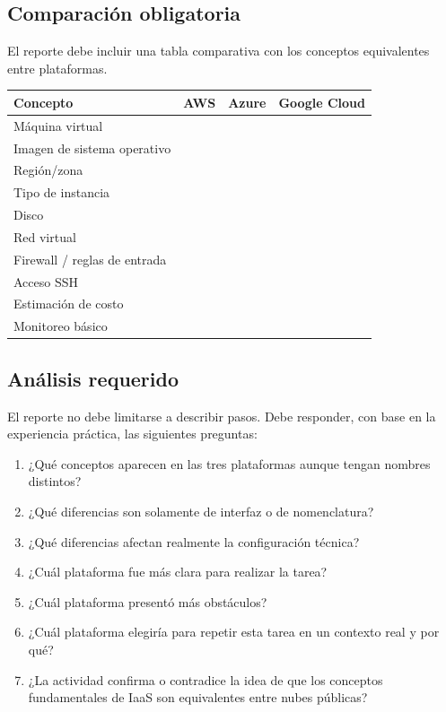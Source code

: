 \documentclass[
  coursetitle={Cómputo Nube y Tecnologías Emergentes},
  coursehours={96},
  coursedate={Verano 2026},
  doctype={Tarea 1},
  otherlangs={english,french},
  authorname={Lázaro},
  authorsurname={Bustio-Martínez},
  authortitle={PhD},
  role={Profesor Investigador},
  email={lbustio@inaoe.mx},
  phone={5559504000},
  ext={7459},
  institution={Instituto Nacional de Astrofísica, Óptica y Electrónica (INAOE)},
  department={Maestría en Ciencias en Tecnologías de Seguridad},
  address={Luis Enrique Erro 1, Sta. Ma. Tonantzintla, San Andrés Cholula, CP 72840, Puebla, México},
  margin={0.5in}
]{lbustio_lecture_notes}
\begin{document}
\subsection{Comparación obligatoria}
\label{sec:tarea1-comparacion}

El reporte debe incluir una tabla comparativa con los conceptos equivalentes entre plataformas.

\begin{center}
\begin{tabular}{|p{}|p{}|p{}|p{}|}
\hline
\textbf{Concepto} & \textbf{AWS} & \textbf{Azure} & \textbf{Google Cloud} \\
\hline
Máquina virtual & & & \\
\hline
Imagen de sistema operativo & & & \\
\hline
Región/zona & & & \\
\hline
Tipo de instancia & & & \\
\hline
Disco & & & \\
\hline
Red virtual & & & \\
\hline
Firewall / reglas de entrada & & & \\
\hline
Acceso SSH & & & \\
\hline
Estimación de costo & & & \\
\hline
Monitoreo básico & & & \\
\hline
\end{tabular}
\end{center}

\subsection{Análisis requerido}
\label{sec:tarea1-analisis}

El reporte no debe limitarse a describir pasos. Debe responder, con base en la experiencia práctica, las siguientes preguntas:

\begin{enumerate}
  \item ¿Qué conceptos aparecen en las tres plataformas aunque tengan nombres distintos?
  \item ¿Qué diferencias son solamente de interfaz o de nomenclatura?
  \item ¿Qué diferencias afectan realmente la configuración técnica?
  \item ¿Cuál plataforma fue más clara para realizar la tarea?
  \item ¿Cuál plataforma presentó más obstáculos?
  \item ¿Cuál plataforma elegiría para repetir esta tarea en un contexto real y por qué?
  \item ¿La actividad confirma o contradice la idea de que los conceptos fundamentales de IaaS son equivalentes entre nubes públicas?
\end{enumerate}
\end{document}
